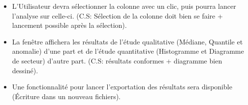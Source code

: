 \begin{enumerate}
				\begin{itemize}
				\item L'Utilisateur devra sélectionner la colonne avec un clic, puis pourra lancer l'analyse sur celle-ci. (C.S: Sélection de la colonne doit bien se faire + lancement possible après la sélection).
				\item La fenêtre affichera les résultats de l'étude qualitative (Médiane, Quantile et anomalie) d'une part et de l'étude quantitative (Histogramme et Diagramme de secteur) d'autre part. (C.S: résultats conformes + diagramme bien dessiné). 
				\item Une fonctionnalité pour lancer l'exportation des résultats sera disponible (Écriture dans un nouveau fichiers).
				\end{itemize}
			\end{enumerate}
		
